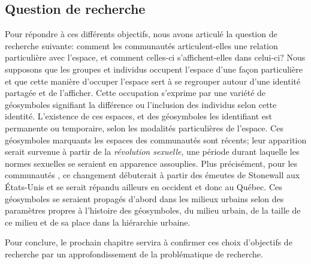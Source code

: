 \subsection*{Question de recherche}
\label{sub:hypothese}
Pour répondre à ces différents objectifs, nous avons articulé la question de recherche suivante: comment les communautés \lgbt{} articulent-elles une relation particulière avec l'espace, et comment celles-ci s'affichent-elles dans celui-ci?
Nous supposons que les groupes et individus \lgbt{} occupent l'espace d'une façon particulière et que cette manière d'occuper l'espace sert à se regrouper autour d'une identité partagée et de l'afficher.
Cette occupation s'exprime par une variété de géosymboles signifiant la différence ou l'inclusion des individus selon cette identité.
L'existence de ces espaces, et des géosymboles les identifiant est permanente ou temporaire, selon les modalités particulières de l'espace.
Ces géosymboles marquants les espaces des communautés \lgbt{} sont récents; leur apparition serait survenue à partir de la \emph{révolution sexuelle}, une période durant laquelle les normes sexuelles se seraient en apparence assouplies.
Plus précisément, pour les communautés \lgbt{}, ce changement débuterait à partir des émeutes de Stonewall aux États-Unis et se serait répandu ailleurs en occident et donc au Québec.
Ces géosymboles se seraient propagés d'abord dans les milieux urbains selon des paramètres propres à l'histoire des géosymboles, du milieu urbain, de la taille de ce milieu et de sa place dans la hiérarchie urbaine.

Pour conclure, le prochain chapitre servira à confirmer ces choix d'objectifs de recherche par un approfondissement de la problématique de recherche.
